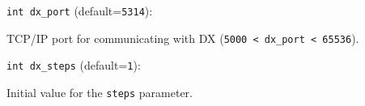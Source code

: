 \item\verb+int dx_port+ {\rm(default=\verb|5314|)}:

TCP/IP port for communicating with DX ({\tt 5000 < dx\_port < 65536}). 

\item\verb+int dx_steps+ {\rm(default=\verb|1|)}:

Initial value for the {\tt steps} parameter. 

